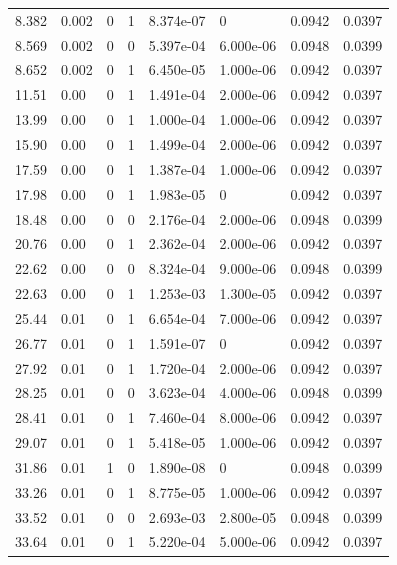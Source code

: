 \documentclass[preview]{standalone}
\begin{document}
{{\begin{tabular}{L{1.2cm}C{1.2cm} C{0.3cm}C{0.5cm} C{1.4cm}C{1.4cm} C{1.4cm}C{1.4cm}}
  8.382  &  0.002  & 0     &  1 &  8.374e-07  & 0  & 0.0942 &  0.0397   \\ 
  8.569  &  0.002  & 0     &  0 &  5.397e-04  & 6.000e-06  & 0.0948 &  0.0399   \\ 
  8.652  &  0.002  & 0     &  1 &  6.450e-05  & 1.000e-06  & 0.0942 &  0.0397   \\ 
  11.51  &  0.00  & 0     &  1 &  1.491e-04  & 2.000e-06  & 0.0942 &  0.0397   \\ 
  13.99  &  0.00  & 0     &  1 &  1.000e-04  & 1.000e-06  & 0.0942 &  0.0397   \\ 
  15.90  &  0.00  & 0     &  1 &  1.499e-04  & 2.000e-06  & 0.0942 &  0.0397   \\ 
  17.59  &  0.00  & 0     &  1 &  1.387e-04  & 1.000e-06  & 0.0942 &  0.0397   \\ 
  17.98  &  0.00  & 0     &  1 &  1.983e-05  & 0  & 0.0942 &  0.0397   \\ 
  18.48  &  0.00  & 0     &  0 &  2.176e-04  & 2.000e-06  & 0.0948 &  0.0399   \\ 
  20.76  &  0.00  & 0     &  1 &  2.362e-04  & 2.000e-06  & 0.0942 &  0.0397   \\ 
  22.62  &  0.00  & 0     &  0 &  8.324e-04  & 9.000e-06  & 0.0948 &  0.0399   \\ 
  22.63  &  0.00  & 0     &  1 &  1.253e-03  & 1.300e-05  & 0.0942 &  0.0397   \\ 
  25.44  &  0.01  & 0     &  1 &  6.654e-04  & 7.000e-06  & 0.0942 &  0.0397   \\ 
  26.77  &  0.01  & 0     &  1 &  1.591e-07  & 0  & 0.0942 &  0.0397   \\ 
  27.92  &  0.01  & 0     &  1 &  1.720e-04  & 2.000e-06  & 0.0942 &  0.0397   \\ 
  28.25  &  0.01  & 0     &  0 &  3.623e-04  & 4.000e-06  & 0.0948 &  0.0399   \\ 
  28.41  &  0.01  & 0     &  1 &  7.460e-04  & 8.000e-06  & 0.0942 &  0.0397   \\ 
  29.07  &  0.01  & 0     &  1 &  5.418e-05  & 1.000e-06  & 0.0942 &  0.0397   \\ 
  31.86  &  0.01  & 1     &  0 &  1.890e-08  & 0  & 0.0948 &  0.0399   \\ 
  33.26  &  0.01  & 0     &  1 &  8.775e-05  & 1.000e-06  & 0.0942 &  0.0397   \\ 
  33.52  &  0.01  & 0     &  0 &  2.693e-03  & 2.800e-05  & 0.0948 &  0.0399   \\ 
  33.64  &  0.01  & 0     &  1 &  5.220e-04  & 5.000e-06  & 0.0942 &  0.0397   \\ 

\end{tabular}}}
\end{document}

